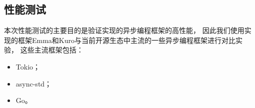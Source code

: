 \documentclass[supercite]{HustGraduPaper}
\theoremstyle{definition}
\begin{document}
%
%
%
%
%
%
%
%
%

\subsection{性能测试}

本次性能测试的主要目的是验证实现的异步编程框架的高性能，
因此我们使用实现的框架Emma和Kuro与当前开源生态中主流的一些异步编程框架进行对比实验，
这些主流框架包括：

\begin{itemize}
  \item Tokio；
  \item async-std；
  \item Go。
\end{itemize}
\end{document}
